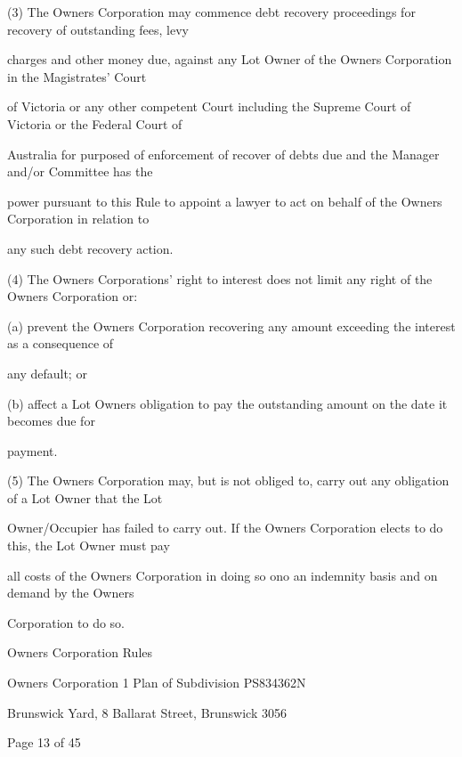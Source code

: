 \documentclass{article}
\begin{document}
{\fontsize{9.962}{1}(3) The Owners Corporation may commence debt recovery proceedings for recovery of outstanding fees, levy }

{\fontsize{10.02}{1}charges and other money due, against any Lot Owner of the Owners Corporation in the Magistrates’ Court }

{\fontsize{10.02}{1}of Victoria or any other competent Court including the Supreme Court of Victoria or the Federal Court of }

{\fontsize{10.02}{1}Australia for purposed of enforcement of recover of debts due and the Manager and/or Committee has the }

{\fontsize{10.02}{1}power pursuant to this Rule to appoint a lawyer to act on behalf of the Owners Corporation in relation to }

{\fontsize{10.02}{1}any such debt recovery action. }

{\fontsize{9.962}{1}(4) The Owners Corporations’ right to interest does not limit any right of the Owners Corporation or: }

{\fontsize{9.962}{1}(a) prevent the Owners Corporation recovering any amount exceeding the interest as a consequence of }

{\fontsize{10.02}{1}any default; or }

{\fontsize{9.962}{1}(b) affect a Lot Owners obligation to pay the outstanding amount on the date it becomes due for }

{\fontsize{10.02}{1}payment. }

{\fontsize{9.962}{1}(5) The Owners Corporation may, but is not obliged to, carry out any obligation of a Lot Owner that the Lot }

{\fontsize{10.02}{1}Owner/Occupier has failed to carry out. If the Owners Corporation elects to do this, the Lot Owner must pay }

{\fontsize{10.02}{1}all costs of the Owners Corporation in doing so ono an indemnity basis and on demand by the Owners }

{\fontsize{10.02}{1}Corporation to do so. }

\newpage





{\fontsize{9}{1}Owners Corporation Rules }

{\fontsize{9}{1}Owners Corporation 1 Plan of Subdivision PS834362N }

{\fontsize{9}{1}Brunswick Yard, 8 Ballarat Street, Brunswick 3056 }


{\fontsize{9}{1}Page 13  of 45 }
\end{document}
